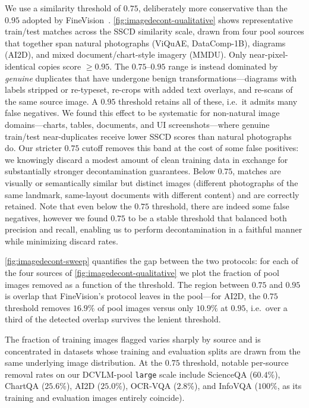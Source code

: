 We use a similarity threshold of $0.75$, deliberately more conservative than the $0.95$ adopted by FineVision~\citep{wiedmann2025finevision}. \cref{fig:imagedecont-qualitative} shows representative train/test matches across the SSCD similarity scale, drawn from four pool sources that together span natural photographs (ViQuAE, DataComp-1B), diagrams (AI2D), and mixed document/chart-style imagery (MMDU). Only near-pixel-identical copies score $\geq 0.95$. The $0.75$--$0.95$ range is instead dominated by \emph{genuine} duplicates that have undergone benign transformations---diagrams with labels stripped or re-typeset, re-crops with added text overlays, and re-scans of the same source image. A $0.95$ threshold retains all of these, i.e.\ it admits many false negatives. We found this effect to be systematic for non-natural image domains---charts, tables, documents, and UI screenshots---where genuine train/test near-duplicates receive lower SSCD scores than natural photographs do. Our stricter $0.75$ cutoff removes this band at the cost of some false positives: we knowingly discard a modest amount of clean training data in exchange for substantially stronger decontamination guarantees. Below $0.75$, matches are visually or semantically similar but distinct images (different photographs of the same landmark, same-layout documents with different content) and are correctly retained. Note that even below the $0.75$ threshold, there are indeed some false negatives, however we found $0.75$ to be a stable threshold that balanced both precision and recall, enabling us to perform decontamination in a faithful manner while minimizing discard rates.

\cref{fig:imagedecont-sweep} quantifies the gap between the two protocols: for each of the four sources of \cref{fig:imagedecont-qualitative} we plot the fraction of pool images removed as a function of the threshold. The region between $0.75$ and $0.95$ is overlap that FineVision's protocol leaves in the pool---for AI2D, the $0.75$ threshold removes $16.9\%$ of pool images versus only $10.9\%$ at $0.95$, i.e.\ over a third of the detected overlap survives the lenient threshold.

The fraction of training images flagged varies sharply by source and is concentrated in datasets whose training and evaluation splits are drawn from the same underlying image distribution. At the $0.75$ threshold, notable per-source removal rates on our DCVLM-pool \texttt{large} scale include ScienceQA ($60.4\%$), ChartQA ($25.6\%$), AI2D ($25.0\%$), OCR-VQA ($2.8\%$), and InfoVQA ($100\%$, as its training and evaluation images entirely coincide). 

